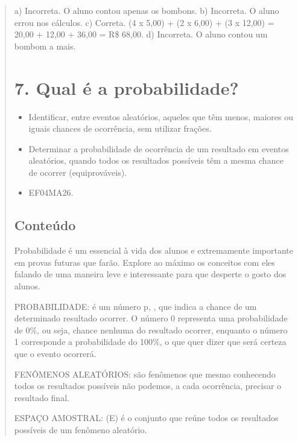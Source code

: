 \begin{enumerate}
\begin{escolha}
\begin{enumerate}
\begin{itemize}
\begin{itemize}
\begin{escolha}
\begin{quote}
\begin{escolha}
a) Incorreta. O aluno contou apenas os bombons.
b) Incorreta. O aluno errou nos cálculos.
c) Correta. (4 x 5,00) + (2 x 6,00) + (3 x 12,00) = 20,00 + 12,00 + 36,00 = R\$ 68,00.
d) Incorreta. O aluno contou um bombom a mais.


\section{7. Qual é a probabilidade?}\label{muxf3dulo-7}


\begin{itemize}
\item Identificar, entre eventos aleatórios, aqueles que têm menos, maiores ou
iguais chances de ocorrência, sem utilizar frações.
\item Determinar a probabilidade de ocorrência de um resultado em eventos
aleatórios, quando todos os resultados possíveis têm a mesma chance de
ocorrer (equiprováveis).
\end{itemize}


\begin{itemize}
\item EF04MA26.
\end{itemize}

\subsection{Conteúdo}\label{conteuxfado-6}

\protect\hypertarget{_Hlk128408075}{}{}Probabilidade é um essencial à
vida dos alunos e extremamente importante em provas futuras que farão.
Explore ao máximo os conceitos com eles falando de uma maneira leve e
interessante para que desperte o gosto dos alunos.

PROBABILIDADE: é um número p, , que indica a chance de um determinado
resultado ocorrer. O número 0 representa uma probabilidade de 0\%, ou
seja, chance nenhuma do resultado ocorrer, enquanto o número 1
corresponde a probabilidade do 100\%, o que quer dizer que será certeza
que o evento ocorrerá.

FENÔMENOS ALEATÓRIOS: são fenômenos que mesmo conhecendo todos os
resultados possíveis não podemos, a cada ocorrência, precisar o
resultado final.

ESPAÇO AMOSTRAL: (E) é o conjunto que reúne todos os resultados
possíveis de um fenômeno aleatório.


\end{escolha}
\end{quote}
\end{escolha}
\end{itemize}
\end{itemize}
\end{enumerate}
\end{escolha}
\end{enumerate}
